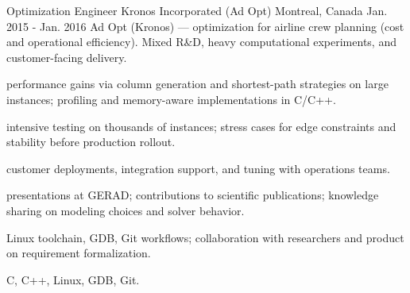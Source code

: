 \begin{cventries}
  \cventrywithintro
    {Optimization Engineer}
    {Kronos Incorporated (Ad Opt)}
    {Montreal, Canada}
    {Jan. 2015 - Jan. 2016}
    {Ad Opt (Kronos) --- optimization for airline crew planning (cost and operational efficiency). Mixed R\&D, heavy computational experiments, and customer-facing delivery.}
    {
      \begin{cvitemsafterintro}
        \item { performance gains via column generation and shortest-path strategies on large instances; profiling and memory-aware implementations in C/C++.}
        \item { intensive testing on thousands of instances; stress cases for edge constraints and stability before production rollout.}
        \item { customer deployments, integration support, and tuning with operations teams.}
        \item { presentations at GERAD; contributions to scientific publications; knowledge sharing on modeling choices and solver behavior.}
        \item { Linux toolchain, GDB, Git workflows; collaboration with researchers and product on requirement formalization.}
      \end{cvitemsafterintro}
    }
    {C, C++, Linux, GDB, Git.}

\end{cventries}
